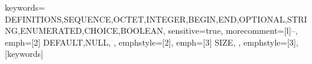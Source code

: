 \def\appendixautorefname{پیوست}

\makeatletter
{}

\newcommand*{\@checkappendixparam}[1]{%
    \def\@checkappendixparamtmp{#1}%
    \ifx\Hy@param\@checkappendixparamtmp
        \let\Hy@param\Hy@appendixstring
    \fi
}
\makeatletter

\newtoggle{inappendix}
\togglefalse{inappendix}







%
{keywords=%
	{DEFINITIONS,SEQUENCE,OCTET,INTEGER,BEGIN,END,OPTIONAL,STRING,ENUMERATED,CHOICE,BOOLEAN},
	sensitive=true,
	morecomment=[l]{--},
	  emph=[2]%
	{%
		DEFAULT,NULL,
	},
	emphstyle=[2]{\color{Red}},
	emph=[3]%
	{%
		SIZE,
	},
	emphstyle=[3]{\color{Plum}},
}[keywords]%




